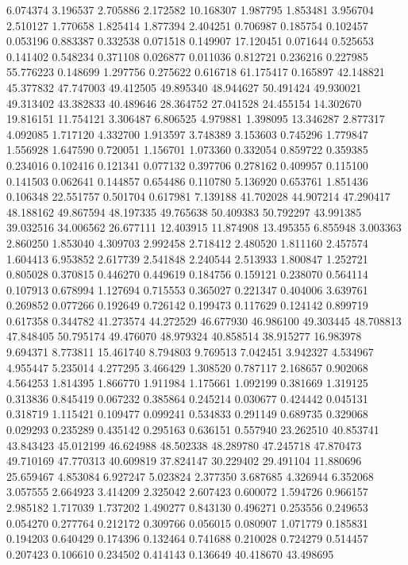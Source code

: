 6.074374
3.196537
2.705886
2.172582
10.168307
1.987795
1.853481
3.956704
2.510127
1.770658
1.825414
1.877394
2.404251
0.706987
0.185754
0.102457
0.053196
0.883387
0.332538
0.071518
0.149907
17.120451
0.071644
0.525653
0.141402
0.548234
0.371108
0.026877
0.011036
0.812721
0.236216
0.227985
55.776223
0.148699
1.297756
0.275622
0.616718
61.175417
0.165897
42.148821
45.377832
47.747003
49.412505
49.895340
48.944627
50.491424
49.930021
49.313402
43.382833
40.489646
28.364752
27.041528
24.455154
14.302670
19.816151
11.754121
3.306487
6.806525
4.979881
1.398095
13.346287
2.877317
4.092085
1.717120
4.332700
1.913597
3.748389
3.153603
0.745296
1.779847
1.556928
1.647590
0.720051
1.156701
1.073360
0.332054
0.859722
0.359385
0.234016
0.102416
0.121341
0.077132
0.397706
0.278162
0.409957
0.115100
0.141503
0.062641
0.144857
0.654486
0.110780
5.136920
0.653761
1.851436
0.106348
22.551757
0.501704
0.617981
7.139188
41.702028
44.907214
47.290417
48.188162
49.867594
48.197335
49.765638
50.409383
50.792297
43.991385
39.032516
34.006562
26.677111
12.403915
11.874908
13.495355
6.855948
3.003363
2.860250
1.853040
4.309703
2.992458
2.718412
2.480520
1.811160
2.457574
1.604413
6.953852
2.617739
2.541848
2.240544
2.513933
1.800847
1.252721
0.805028
0.370815
0.446270
0.449619
0.184756
0.159121
0.238070
0.564114
0.107913
0.678994
1.127694
0.715553
0.365027
0.221347
0.404006
3.639761
0.269852
0.077266
0.192649
0.726142
0.199473
0.117629
0.124142
0.899719
0.617358
0.344782
41.273574
44.272529
46.677930
46.986100
49.303445
48.708813
47.848405
50.795174
49.476070
48.979324
40.858514
38.915277
16.983978
9.694371
8.773811
15.461740
8.794803
9.769513
7.042451
3.942327
4.534967
4.955447
5.235014
4.277295
3.466429
1.308520
0.787117
2.168657
0.902068
4.564253
1.814395
1.866770
1.911984
1.175661
1.092199
0.381669
1.319125
0.313836
0.845419
0.067232
0.385864
0.245214
0.030677
0.424442
0.045131
0.318719
1.115421
0.109477
0.099241
0.534833
0.291149
0.689735
0.329068
0.029293
0.235289
0.435142
0.295163
0.636151
0.557940
23.262510
40.853741
43.843423
45.012199
46.624988
48.502338
48.289780
47.245718
47.870473
49.710169
47.770313
40.609819
37.824147
30.229402
29.491104
11.880696
25.659467
4.853084
6.927247
5.023824
2.377350
3.687685
4.326944
6.352068
3.057555
2.664923
3.414209
2.325042
2.607423
0.600072
1.594726
0.966157
2.985182
1.717039
1.737202
1.490277
0.843130
0.496271
0.253556
0.249653
0.054270
0.277764
0.212172
0.309766
0.056015
0.080907
1.071779
0.185831
0.194203
0.640429
0.174396
0.132464
0.741688
0.210028
0.724279
0.514457
0.207423
0.106610
0.234502
0.414143
0.136649
40.418670
43.498695
